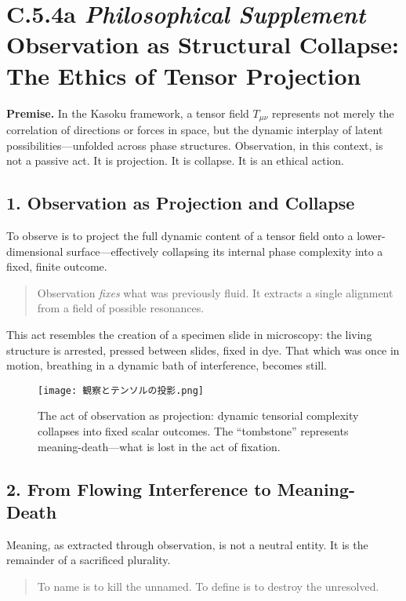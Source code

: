 
\section*{C.5.4a \textit{Philosophical Supplement} \\ Observation as Structural Collapse: The Ethics of Tensor Projection}

\textbf{Premise.} In the Kasoku framework, a tensor field \( T_{\mu\nu} \) represents not merely the correlation of directions or forces in space, but the dynamic interplay of latent possibilities—unfolded across phase structures. Observation, in this context, is not a passive act. It is projection. It is collapse. It is an ethical action.

\subsection*{1. Observation as Projection and Collapse}
To observe is to project the full dynamic content of a tensor field onto a lower-dimensional surface—effectively collapsing its internal phase complexity into a fixed, finite outcome. 

\begin{quote}
    Observation \emph{fixes} what was previously fluid. It extracts a single alignment from a field of possible resonances.
\end{quote}

This act resembles the creation of a specimen slide in microscopy: the living structure is arrested, pressed between slides, fixed in dye. That which was once in motion, breathing in a dynamic bath of interference, becomes still.

\begin{figure}[h!]
\centering
\texttt{[image: 観察とテンソルの投影.png]}
\caption{The act of observation as projection: dynamic tensorial complexity collapses into fixed scalar outcomes. The “tombstone” represents meaning-death—what is lost in the act of fixation.}
\end{figure}

\subsection*{2. From Flowing Interference to Meaning-Death}
Meaning, as extracted through observation, is not a neutral entity. It is the remainder of a sacrificed plurality.

\begin{quote}
    To name is to kill the unnamed. To define is to destroy the unresolved.
\end{quote}

